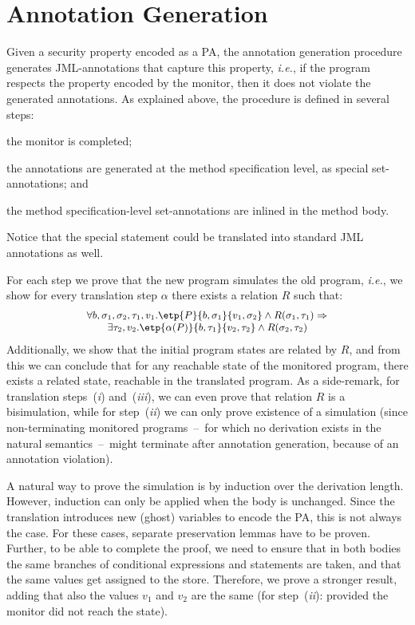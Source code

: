 \section{Annotation Generation}\label{SecAnnotGen}

Given a security property encoded as a PA, the annotation generation
procedure generates JML-annotations that capture this property,
\emph{i.e.}, if the program respects the property encoded by the
monitor, then it does not violate the generated annotations. As
explained above, the procedure is defined in several steps:
\begin{inparaenum}
\item the monitor is completed; %
\item the annotations are generated at the method specification level,
as special set-annotations; and
\item the method specification-level set-annotations are inlined in
the method body.
\end{inparaenum}
Notice that the special \CaseJML statement could be translated into
standard JML annotations as well.

For each step we prove that the new program simulates the old program,
\emph{i.e.}, we show for every translation step
\(\alpha\) there exists a relation \(R\) such that:
\[{\small
\begin{array}{l}
\forall b, \sigma_1, \sigma_2, \tau_1, v_1.
\etp{P}{b,\sigma_1}{v_1, \sigma_2} \wedge
R(\sigma_1, \tau_1) \Rightarrow \\
\qquad
\exists \tau_2, v_2.
\etp{\alpha(P)}{b, \tau_1}{v_2, \tau_2} \wedge
R(\sigma_2, \tau_2)
\end{array}}
\]
Additionally, we show that the initial program states are related by
\(R\), and from this we can conclude that for any reachable state of
the monitored program, there exists a related state, reachable in the
translated program. As a side-remark, for translation steps~(\emph{i})
and~(\emph{iii}), we can even prove that relation \(R\) is a
bisimulation, while for step~(\emph{ii}) we can only prove existence
of a simulation (since non-terminating monitored programs~--~for which
no derivation exists in the natural semantics~--~might terminate after
annotation generation, because of an annotation violation).

A natural way to prove the simulation is by induction over the
derivation length.  However, induction can only be applied when the
body is unchanged. Since the translation introduces new (ghost)
variables to encode the PA, this is not always the case. For these
cases, separate preservation lemmas have to be proven.  Further, to be
able to complete the proof, we need to ensure that in both bodies the
same branches of conditional expressions and statements are taken, and
that the same values get assigned to the store. Therefore, we prove a
stronger result, adding that also the values %
\(v_1\) and \(v_2\) are the same (for step~(\emph{ii}): provided the
monitor did not reach the \halted state).


